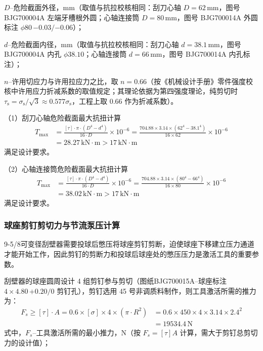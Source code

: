 $D$--危险截面外径，mm（取值与抗拉校核相同：刮刀心轴 $D = 62$\,mm，图号 BJG700004A 左端牙槽根外圆；心轴连接筒 $D = 80$\,mm，图号 BJG700014A 外圆标注 $\phi 80\,{-0.03}/{-0.06}$）；

$d$--危险截面内径，mm（取值与抗拉校核相同：刮刀心轴 $d = 38.1$\,mm，图号 BJG700004A 内孔 $\phi 38.10$；心轴连接筒 $d = 66$\,mm，图号 BJG700014A 内孔标注）；

$n$--许用切应力与许用拉应力之比，取 $n = 0.66$（按《机械设计手册》零件强度校核中许用应力折减系数的取值规定\cite{ref26}；其理论依据为第四强度理论，纯剪切时 $\tau_{\mathrm{s}} = \sigma_{\mathrm{s}}/\sqrt{3} \approx 0.577\sigma_{\mathrm{s}}$，工程上取 $0.66$ 作为折减系数）。

（1）刮刀心轴危险截面最大抗扭计算
\begin{equation}
    \begin{aligned}
    T_{\max} &= \frac{[\tau] \cdot \pi \cdot (D^4 - d^4)}{16 \cdot D} \times 10^{-6}
             = \frac{704.88 \times 3.14 \times (62^4 - 38.1^4)}{16 \times 62} \times 10^{-6} \\
             &= 28.27\,\mathrm{kN}\cdot\mathrm{m} > 17\,\mathrm{kN}\cdot\mathrm{m}
\end{aligned}
\end{equation}
满足设计要求。

（2）心轴连接筒危险截面最大抗扭计算
\begin{equation}
    \begin{aligned}
    T_{\max} &= \frac{[\tau] \cdot \pi \cdot (D^4 - d^4)}{16 \cdot D} \times 10^{-6}
             = \frac{704.88 \times 3.14 \times (80^4 - 66^4)}{16 \times 80} \times 10^{-6} \\
             &= 38.02\,\mathrm{kN}\cdot\mathrm{m} > 17\,\mathrm{kN}\cdot\mathrm{m}
\end{aligned}
\end{equation}
满足设计要求。


\subsubsection{球座剪钉剪切力与节流泵压计算}

9-5/8\inch 可变径刮壁器需要投球后憋压将球座剪钉剪断，迫使球座下移建立压力通道才能开始工作，因此剪钉的剪断力和投球后球座处的憋压压力是激活工具的重要参数。

刮壁器的球座圆周设计 4 组剪钉参与剪切（图纸BJG700015A--球座标注 $4\times 4.80\,{+0.20}/0$ 剪钉孔），剪钉选用 45 号非调质料制作，则工具激活所需的推力为：
\begin{equation}
    \begin{aligned}
        F_s \ge [\tau] \cdot A = 0.6 \times [\sigma] \times 4 \times (\pi \cdot R^2) &= 0.6 \times 450 \times 4 \times 3.14 \times 2.4^2 \\
        &= 19534.4\,\mathrm{N}
    \end{aligned}
\end{equation}
式中，$F_s$--工具激活所需的最小推力，N（按 $F_s = [\tau]A$ 计算，需大于剪钉总剪切力的设计值）；

